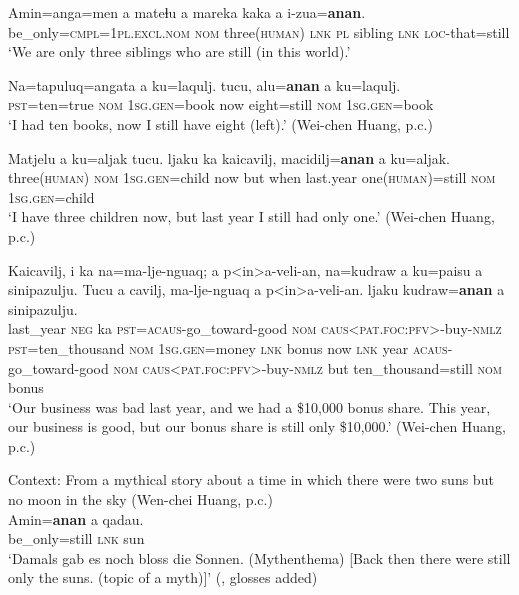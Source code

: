 \begin{exe}
	\ex\label{exAppendixPaiwanScalar1}
	\gll Amin=anga=men a mateɬu a mareka kaka a i-zua=\textbf{anan}.\\
	be\_only=\textsc{cmpl}=1\textsc{pl}.\textsc{excl}.\textsc{nom} \textsc{nom} three(\textsc{human}) \textsc{lnk} \textsc{pl} sibling \textsc{lnk} \textsc{loc}-that=still\\
	\glt \lq We are only three siblings who are still (in this world).\rq{ }\parencite[190]{Chang2006}

	\ex \label{exAppendixPaiwanScalar2}
	\gll Na=tapuluq=angata  a       ku=laqulj.        tucu, alu=\textbf{anan}  a       ku=laqulj.\\
\textsc{pst}=ten=true  \textsc{nom} 1\textsc{sg}.\textsc{gen}=book  now eight=still  \textsc{nom} 1\textsc{sg}.\textsc{gen}=book\\
	\glt \lq I had ten books, now I still have eight (left).\rq{ }(Wei-chen Huang, p.c.)

	\ex \label{exAppendixPaiwanScalar3}
	\gll  Matjelu        a       ku=aljak tucu. ljaku ka      kaicavilj, macidilj=\textbf{anan}    a       ku=aljak.\\
three(\textsc{human}) \textsc{nom} 1\textsc{sg}.\textsc{gen}=child  now but  when last.year one(\textsc{human})=still \textsc{nom} 1\textsc{sg}.\textsc{gen}=child\\
\glt \lq I have three children now, but last year I still had only one.\rq{ }(Wei-chen Huang, p.c.)

	\ex \label{exAppendixPaiwanScalar4}
	\gll Kaicavilj, i       ka  na=ma-lje-nguaq; a       p<in>a-veli-an,        na=kudraw             a       ku=paisu          a   sinipazulju. Tucu a   cavilj, ma-lje-nguaq a        p<in>a-veli-an.         ljaku kudraw=\textbf{anan}        a       sinipazulju.\\
last\_year \textsc{neg} ka \textsc{pst}=\textsc{acaus}-go\_toward-good \textsc{nom} \textsc{caus}<\textsc{pat}.\textsc{foc}:\textsc{pfv}>-buy-\textsc{nmlz} \textsc{pst}=ten\_thousand \textsc{nom} 1\textsc{sg}.\textsc{gen}=money \textsc{lnk} bonus now \textsc{lnk} year \textsc{acaus}-go\_toward-good \textsc{nom} \textsc{caus}<\textsc{pat}.\textsc{foc}:\textsc{pfv}>-buy-\textsc{nmlz} but ten\_thousand=still \textsc{nom} bonus\\
		\glt \lq Our business was bad last year, and we had a \$10,000 bonus share. This year, our business is good, but our bonus share is still only \$10,000.\rq{ }(Wei-chen Huang, p.c.)

	\ex\label{exAppendixPaiwanScalar5}
	Context: From a mythical story about a time in which there were two suns but no moon in the sky (Wen-chei Huang, p.c.)\\
	\gll Amin=\textbf{anan} a qadau.\\
	be\_only=still \textsc{lnk} sun\\
	\glt \lq Damals gab es noch bloss die Sonnen. (Mythenthema) [Back then there were still only the suns. (topic of a myth)]\rq{ }(\cite[29]{Egli2002}, glosses added)
\end{exe}

